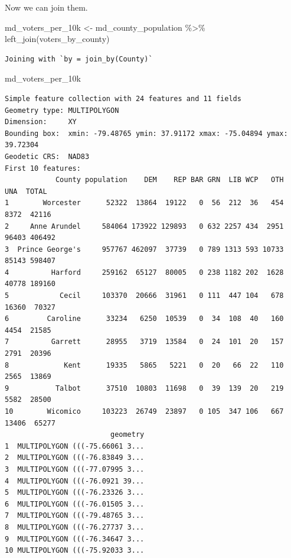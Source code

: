 \documentclass[
  letterpaper,
  DIV=11,
  numbers=noendperiod]{scrreprt}
\newenvironment{Shaded}{\begin{snugshade}}{\end{snugshade}}
\newcommand{\FunctionTok}[1]{\textcolor[rgb]{0.28,0.35,0.67}{#1}}
\newcommand{\NormalTok}[1]{\textcolor[rgb]{0.00,0.23,0.31}{#1}}
\newcommand{\OtherTok}[1]{\textcolor[rgb]{0.00,0.23,0.31}{#1}}
\newcommand{\SpecialCharTok}[1]{\textcolor[rgb]{0.37,0.37,0.37}{#1}}
\begin{document}
Now we can join them.

\begin{Shaded}
\begin{Highlighting}[]
\NormalTok{md\_voters\_per\_10k }\OtherTok{\textless{}{-}}\NormalTok{ md\_county\_population }\SpecialCharTok{\%\textgreater{}\%}
  \FunctionTok{left\_join}\NormalTok{(voters\_by\_county)}
\end{Highlighting}
\end{Shaded}

\begin{verbatim}
Joining with `by = join_by(County)`
\end{verbatim}

\begin{Shaded}
\begin{Highlighting}[]
\NormalTok{md\_voters\_per\_10k}
\end{Highlighting}
\end{Shaded}

\begin{verbatim}
Simple feature collection with 24 features and 11 fields
Geometry type: MULTIPOLYGON
Dimension:     XY
Bounding box:  xmin: -79.48765 ymin: 37.91172 xmax: -75.04894 ymax: 39.72304
Geodetic CRS:  NAD83
First 10 features:
            County population    DEM    REP BAR GRN  LIB WCP   OTH   UNA  TOTAL
1        Worcester      52322  13864  19122   0  56  212  36   454  8372  42116
2     Anne Arundel     584064 173922 129893   0 632 2257 434  2951 96403 406492
3  Prince George's     957767 462097  37739   0 789 1313 593 10733 85143 598407
4          Harford     259162  65127  80005   0 238 1182 202  1628 40778 189160
5            Cecil     103370  20666  31961   0 111  447 104   678 16360  70327
6         Caroline      33234   6250  10539   0  34  108  40   160  4454  21585
7          Garrett      28955   3719  13584   0  24  101  20   157  2791  20396
8             Kent      19335   5865   5221   0  20   66  22   110  2565  13869
9           Talbot      37510  10803  11698   0  39  139  20   219  5582  28500
10        Wicomico     103223  26749  23897   0 105  347 106   667 13406  65277
                         geometry
1  MULTIPOLYGON (((-75.66061 3...
2  MULTIPOLYGON (((-76.83849 3...
3  MULTIPOLYGON (((-77.07995 3...
4  MULTIPOLYGON (((-76.0921 39...
5  MULTIPOLYGON (((-76.23326 3...
6  MULTIPOLYGON (((-76.01505 3...
7  MULTIPOLYGON (((-79.48765 3...
8  MULTIPOLYGON (((-76.27737 3...
9  MULTIPOLYGON (((-76.34647 3...
10 MULTIPOLYGON (((-75.92033 3...
\end{verbatim}
\end{document}
